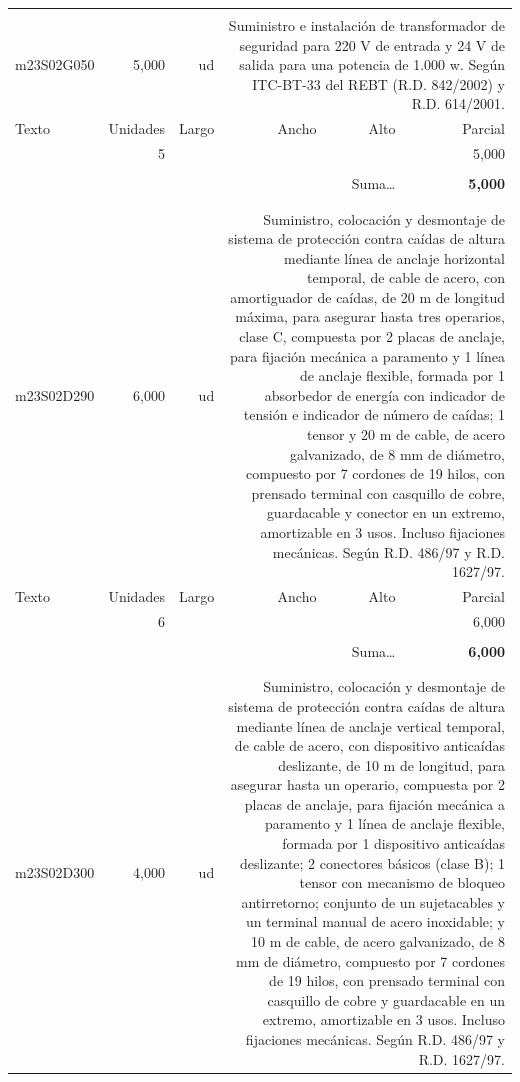 \documentclass{book}%
\begin{document}
\begin{longtable}{lrrrrr}
&&&&&\\%
m23S02G050&     5,000& ud&\multicolumn{3}{p{6cm}}{\scriptsize Suministro e instalación de transformador de seguridad para 220 V de entrada y 24 V de salida para una potencia de 1.000 w. Según ITC-BT-33 del REBT (R.D. 842/2002) y R.D. 614/2001.\normalsize}\\%
Texto&Unidades&Largo&Ancho&Alto&Parcial\\%
\hline%
\multicolumn{1}{p{3.5cm}}{ }&5&&&&     5,000\\%
&&&&&\\%
\multicolumn{5}{r}{Suma\ldots}&\textbf{     5,000}\\%
\hline%
&&&&&\\%
&&&&&\\%
m23S02D290&     6,000& ud&\multicolumn{3}{p{6cm}}{\scriptsize Suministro, colocación y desmontaje de sistema de protección contra caídas de altura mediante línea de anclaje horizontal temporal, de cable de acero, con amortiguador de caídas, de 20 m de longitud máxima, para asegurar hasta tres operarios, clase C, compuesta por 2 placas de anclaje, para fijación mecánica a paramento y 1 línea de anclaje flexible, formada por 1 absorbedor de energía con indicador de tensión e indicador de número de caídas; 1 tensor y 20 m de cable, de acero galvanizado, de 8 mm de diámetro, compuesto por 7 cordones de 19 hilos, con prensado terminal con casquillo de cobre, guardacable y conector en un extremo, amortizable en 3 usos. Incluso fijaciones mecánicas. Según R.D. 486/97 y R.D. 1627/97.\normalsize}\\%
Texto&Unidades&Largo&Ancho&Alto&Parcial\\%
\hline%
\multicolumn{1}{p{3.5cm}}{ }&6&&&&     6,000\\%
&&&&&\\%
\multicolumn{5}{r}{Suma\ldots}&\textbf{     6,000}\\%
\hline%
&&&&&\\%
&&&&&\\%
m23S02D300&     4,000& ud&\multicolumn{3}{p{6cm}}{\scriptsize Suministro, colocación y desmontaje de sistema de protección contra caídas de altura mediante línea de anclaje vertical temporal, de cable de acero, con dispositivo anticaídas deslizante, de 10 m de longitud, para asegurar hasta un operario, compuesta por 2 placas de anclaje, para fijación mecánica a paramento y 1 línea de anclaje flexible, formada por 1 dispositivo anticaídas deslizante; 2 conectores básicos (clase B); 1 tensor con mecanismo de bloqueo antirretorno; conjunto de un sujetacables y un terminal manual de acero inoxidable; y 10 m de cable, de acero galvanizado, de 8 mm de diámetro, compuesto por 7 cordones de 19 hilos, con prensado terminal con casquillo de cobre y guardacable en un extremo, amortizable en 3 usos. Incluso fijaciones mecánicas. Según R.D. 486/97 y R.D. 1627/97.\normalsize}\\%

\end{longtable}
\end{document}
